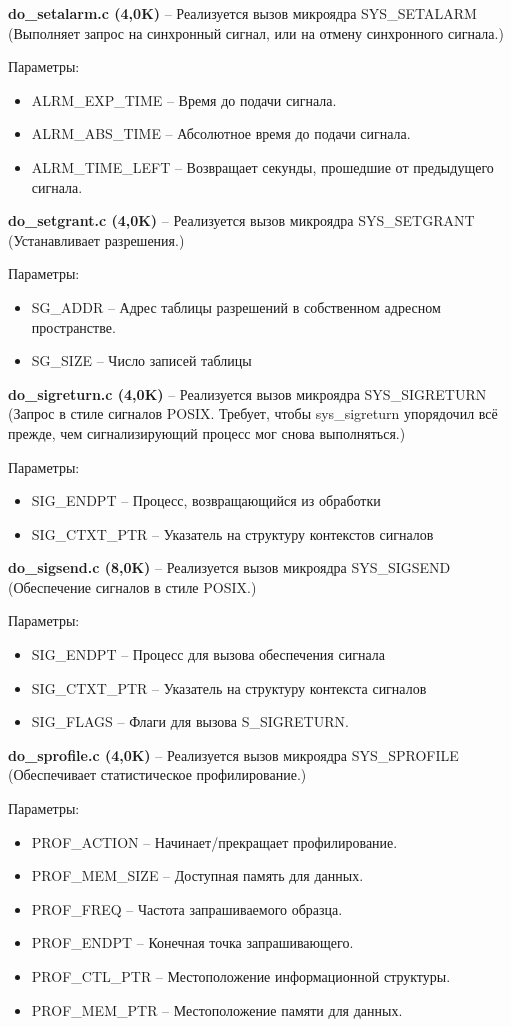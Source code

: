 \textbf{do\_setalarm.c (4,0K)} -- Реализуется вызов микроядра SYS\_SETALARM (Выполняет запрос на синхронный сигнал, или на отмену синхронного сигнала.)

Параметры:
\begin{itemize}
\item ALRM\_EXP\_TIME -- Время до подачи сигнала.
\item ALRM\_ABS\_TIME -- Абсолютное время до подачи сигнала.
\item ALRM\_TIME\_LEFT -- Возвращает секунды, прошедшие от предыдущего сигнала.
\end{itemize}

\textbf{do\_setgrant.c (4,0K)} -- Реализуется вызов микроядра SYS\_SETGRANT (Устанавливает разрешения.)

Параметры:
\begin{itemize}
\item SG\_ADDR -- Адрес таблицы разрешений в собственном адресном пространстве.
\item SG\_SIZE  -- Число записей таблицы
\end{itemize}

\textbf{do\_sigreturn.c (4,0K)} -- Реализуется вызов микроядра SYS\_SIGRETURN (Запрос в стиле сигналов POSIX. Требует, чтобы sys\_sigreturn упорядочил всё прежде, чем сигнализирующий процесс мог снова выполняться.)

Параметры:
\begin{itemize}
\item SIG\_ENDPT -- Процесс, возвращающийся из обработки
\item SIG\_CTXT\_PTR -- Указатель на структуру контекстов сигналов
\end{itemize}

\textbf{do\_sigsend.c (8,0K)} -- Реализуется вызов микроядра SYS\_SIGSEND (Обеспечение сигналов в стиле POSIX.)

Параметры:
\begin{itemize}
\item SIG\_ENDPT -- Процесс для вызова обеспечения сигнала
\item SIG\_CTXT\_PTR -- Указатель на структуру контекста сигналов
\item SIG\_FLAGS -- Флаги для вызова S\_SIGRETURN.
\end{itemize}

\textbf{do\_sprofile.c (4,0K)} -- Реализуется вызов микроядра SYS\_SPROFILE (Обеспечивает статистическое профилирование.)

Параметры:
\begin{itemize}
\item PROF\_ACTION -- Начинает/прекращает профилирование.
\item PROF\_MEM\_SIZE -- Доступная память для данных.
\item PROF\_FREQ -- Частота запрашиваемого образца.
\item PROF\_ENDPT -- Конечная точка запрашивающего.
\item PROF\_CTL\_PTR -- Местоположение информационной структуры.
\item PROF\_MEM\_PTR -- Местоположение памяти для данных.
\end{itemize}

